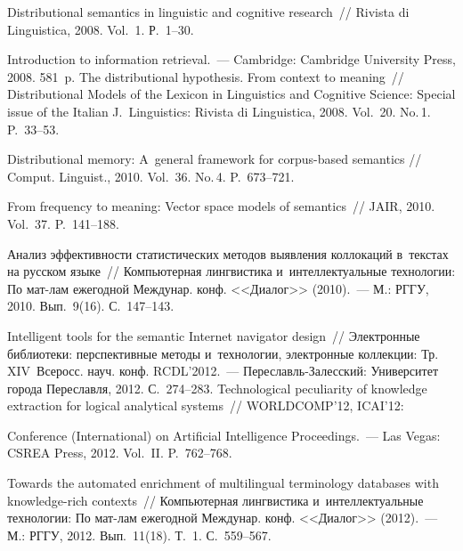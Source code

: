 \begin{multicols}{2}
{{\begin{thebibliography}{99}
 Distributional semantics in linguistic and cognitive research~//
Rivista di Linguistica, 2008. Vol.~1. Р.~1--30.

 Introduction to
information retrieval.~--- Cambridge: Cambridge University Press, 2008. 581~p.
 The distributional hypothesis. From context to meaning~//
Distributional Models of the Lexicon in Linguistics and Cognitive Science:
Special issue of the Italian J.~Linguistics: Rivista di Linguistica, 2008. Vol.~20. No.\,1. P.~33--53.

 Distributional memory: A~general framework for
corpus-based semantics // Comput. Linguist., 2010. Vol.~36. No.\,4.
P.~673--721.

 From frequency to meaning: Vector space models of
semantics~// JAIR, 2010. Vol.~37. P.~141--188.

 Анализ эффек\-тив\-ности статистических
методов выявления коллокаций в~текстах на русском языке~// Компьютерная
лингвистика и~интеллектуальные технологии: По мат-лам ежегодной
Междунар. конф. <<Диалог>> (2010).~---  М.: РГГУ, 2010. Вып.~9(16).
С.~147--143.

 Intelligent tools for the semantic Internet
navigator design~// Электронные библиотеки: перспективные методы и~технологии, электронные коллекции: Тр. XIV~Всеросс. науч. конф.
RCDL'2012.~--- Пе\-ре\-славль-За\-лес\-ский: Университет города
Переславля, 2012. С.~274--283.
 Technological peculiarity
of knowledge extraction for logical analytical systems~// WORLDCOMP'12,
ICAI'12:\linebreak\vspace*{-12pt}

 \pagebreak

  Conference (International) on Artificial Intelligence
Proceedings.~--- Las Vegas: CSREA Press, 2012. Vol.~II. P.~762--768.


 Towards the automated enrichment of multilingual terminology
databases with knowledge-rich contexts~// Компьютерная лингвистика и~интеллектуальные технологии: По мат-лам ежегодной Междунар. конф.
<<Диалог>> (2012).~--- М.: РГГУ, 2012. Вып.~11(18). Т.~1. С.~559--567.


\end{thebibliography}}}
\end{multicols}
